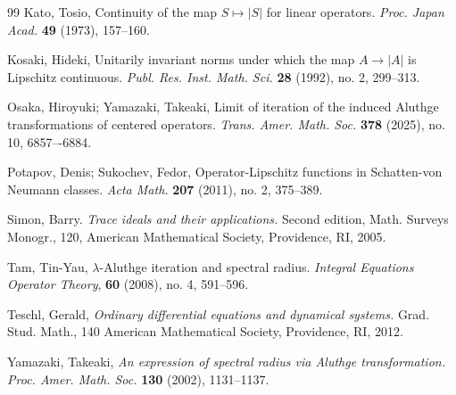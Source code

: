 \documentclass[12pt]{article}
\theoremstyle{definition}
\numberwithin{equation}{section}
\begin{document}
\begin{thebibliography}{99}
Kato, Tosio, 
Continuity of the map $S\mapsto |S|$ for linear operators.
\textit{Proc. Japan Acad.} \textbf{49} (1973), 157--160.



 Kosaki, Hideki, 
Unitarily invariant norms under which the map $A\to |A|$ is Lipschitz continuous. 
\textit{Publ. Res. Inst. Math. Sci.} \textbf{28} (1992), no. 2, 299--313.

Osaka, Hiroyuki; Yamazaki, Takeaki, 
Limit of iteration of the induced Aluthge transformations of centered operators. 
\textit{Trans. Amer. Math. Soc.} \textbf{378} (2025), no. 10, 6857–-6884.

 Potapov, Denis; Sukochev, Fedor, 
Operator-Lipschitz functions in Schatten-von Neumann classes. 
\textit{Acta Math.} \textbf{207} (2011), no. 2, 375--389. 


 Simon, Barry. 
\textit{Trace ideals and their applications.} 
Second edition, Math. Surveys Monogr., 120, 
American Mathematical Society, Providence, RI, 2005.

Tam, Tin-Yau, 
$\lambda$-Aluthge iteration and spectral radius. 
\textit{Integral Equations Operator Theory}, \textbf{60} (2008), no. 4, 591--596.

 Teschl, Gerald, 
\textit{Ordinary differential equations and dynamical systems.} 
Grad. Stud. Math., 140
American Mathematical Society, Providence, RI, 2012. 


 Yamazaki, Takeaki, 
\textit{An expression of spectral radius via Aluthge transformation.}
\textit{Proc. Amer. Math. Soc.} \textbf{130} (2002), 1131--1137. 
\end{thebibliography}
\end{document}
